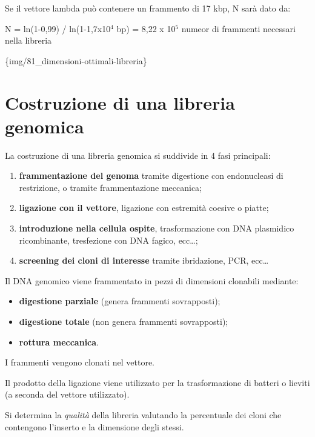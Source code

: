 \documentclass[11pt]{book}
\begin{document}
Se il vettore lambda può contenere un frammento di 17 kbp, N sarà dato
da:

N = ln(1-0,99) / ln(1-1,7x10\(^4\) bp) = 8,22 x 10\(^5\) numeor di
frammenti necessari nella libreria

\{img/81\_dimensioni-ottimali-libreria\}

\section{Costruzione di una libreria
genomica}\label{costruzione-di-una-libreria-genomica}

La costruzione di una libreria genomica si suddivide in 4 fasi
principali:

\begin{enumerate}
\def\labelenumi{\arabic{enumi}.}
\itemsep1pt\parskip0pt
\item
  \textbf{frammentazione del genoma} tramite digestione con endonucleasi
  di restrizione, o tramite frammentazione meccanica;
\item
  \textbf{ligazione con il vettore}, ligazione con estremità coesive o
  piatte;
\item
  \textbf{introduzione nella cellula ospite}, trasformazione con DNA
  plasmidico ricombinante, tresfezione con DNA fagico, ecc\ldots{};
\item
  \textbf{screening dei cloni di interesse} tramite ibridazione, PCR,
  ecc\ldots{}
\end{enumerate}

Il DNA genomico viene frammentato in pezzi di dimensioni clonabili
mediante:

\begin{itemize}
\itemsep1pt\parskip0pt
\item
  \textbf{digestione parziale} (genera frammenti sovrapposti);
\item
  \textbf{digestione totale} (non genera frammenti sovrapposti);
\item
  \textbf{rottura meccanica}.
\end{itemize}

I frammenti vengono clonati nel vettore.

Il prodotto della ligazione viene utilizzato per la trasformazione di
batteri o lieviti (a seconda del vettore utilizzato).

Si determina la \emph{qualità} della libreria valutando la percentuale
dei cloni che contengono l'inserto e la dimensione degli stessi.
\end{document}
